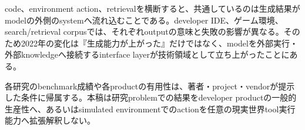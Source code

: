 code、environment action、retrievalを横断すると、共通しているのは生成結果がmodelの外側のsystemへ流れ込むことである。developer IDE、ゲーム環境、search/retrieval corpusでは、それぞれoutputの意味と失敗の影響が異なる。そのため2022年の変化は『生成能力が上がった』だけではなく、modelを外部実行・外部knowledgeへ接続するinterface layerが技術領域として立ち上がったことにある。\autocite{src-039e57a4916e,src-21b0842f98ec,src-4e33c3e8216e,src-811e1008822e,src-8170b5e4c279,src-b1418e7ae779,src-d117f3860a91,src-dc0d76e03fc6}


\begin{claimboundary}
各研究のbenchmark成績や各productの有用性は、著者・project・vendorが提示した条件に帰属する。本稿は研究problemでの結果をdeveloper productの一般的生産性へ、あるいはsimulated environmentでのactionを任意の現実世界tool実行能力へ拡張解釈しない。\autocite{src-811e1008822e,src-b1418e7ae779}
\end{claimboundary}
